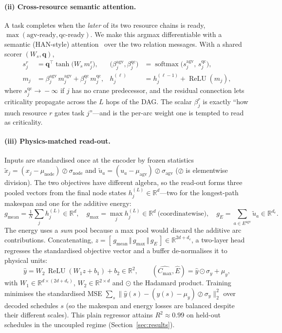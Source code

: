 \documentclass[11pt]{article}
\newcommand{\Cmax}{C_{\max}}
\newcommand{\R}{\mathbb{R}}
\DeclareMathOperator{\softmax}{softmax}
\DeclareMathOperator{\ReLU}{ReLU}
\DeclareMathOperator*{\maxop}{max}
\newcommand{\concat}{\,\Vert\,}
\begin{document}
\paragraph{(ii) Cross-resource semantic attention.}
A task completes when the \emph{later} of its two resource chains is ready,
$\max(\text{agv-ready},\text{qc-ready})$. We make this argmax differentiable with a
semantic (HAN-style) attention~\cite{wang2019han} over the two relation messages. With a
shared scorer $(W_s,\mathbf q)$,
\begin{align}
s^{r}_j &= \mathbf q^{\!\top}\tanh\!\big(W_s\, m^{r}_j\big),
&
\big(\beta^{\mathrm{agv}}_j,\beta^{\mathrm{qc}}_j\big)
&= \softmax\big(s^{\mathrm{agv}}_j,\, s^{\mathrm{qc}}_j\big),
\label{eq:sem}\\[2pt]
m_j &= \beta^{\mathrm{agv}}_j\, m^{\mathrm{agv}}_j
      + \beta^{\mathrm{qc}}_j\, m^{\mathrm{qc}}_j,
&
h_j^{(\ell)} &= h_j^{(\ell-1)} + \ReLU(m_j),
\end{align}
where $s^{\mathrm{qc}}_j\!\to\!-\infty$ if $j$ has no crane predecessor, and the residual
connection lets criticality propagate across the $L$ hops of the DAG. The scalar
$\beta^{r}_j$ is exactly ``how much resource $r$ gates task $j$''---and is the per-arc weight
one is tempted to read as criticality.

\paragraph{(iii) Physics-matched read-out.}
Inputs are standardised once at the encoder by frozen statistics
$\tilde x_j=(x_j-\mu_{\mathrm{node}})\oslash\sigma_{\mathrm{node}}$ and
$\tilde u_a=(u_a-\mu_{\mathrm{agv}})\oslash\sigma_{\mathrm{agv}}$ ($\oslash$ is elementwise
division). The two objectives have different algebra, so the read-out forms three
pooled vectors from the final node states $h^{(L)}_j\in\R^{d}$---two for the longest-path
makespan and one for the additive energy:
\begin{equation}
g_{\mathrm{mean}}=\tfrac1N\!\sum_{j} h^{(L)}_j\in\R^{d},\quad
g_{\max}=\maxop_{j} h^{(L)}_j\in\R^{d}\ \text{(coordinatewise)},\quad
g_{E}=\!\!\sum_{a\in E^{\mathrm{agv}}}\!\! \tilde u_a\in\R^{d_e}.
\end{equation}
The energy uses a \emph{sum} pool because a max pool would discard the additive arc
contributions. Concatenating, $z=[\,g_{\mathrm{mean}}\concat g_{\max}\concat g_{E}\,]\in
\R^{2d+d_e}$, a two-layer head regresses the standardised objective vector and a buffer
de-normalises it to physical units:
\begin{equation}
\hat y = W_2\,\ReLU(W_1 z + b_1)+b_2\in\R^{2},\qquad
(\widehat{\Cmax},\widehat E)=\hat y\odot\sigma_{y}+\mu_{y},
\label{eq:readout}
\end{equation}
with $W_1\in\R^{d\times(2d+d_e)}$, $W_2\in\R^{2\times d}$ and $\odot$ the Hadamard product.
Training minimises the standardised MSE
$\sum_s\big\|\hat y(s)-(y(s)-\mu_y)\oslash\sigma_y\big\|_2^2$ over decoded schedules $s$
(so the makespan and energy losses are balanced despite their different scales). This
plain regressor attains $R^2\approx0.99$ on held-out schedules in the uncoupled regime
(Section~\ref{sec:results}).
\end{document}
